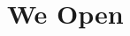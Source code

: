 \documentclass[tom-ari]{subfile}
\begin{document}
	
	\chapter{We Open}
	
	\lipsum[4]
	
\end{document}
